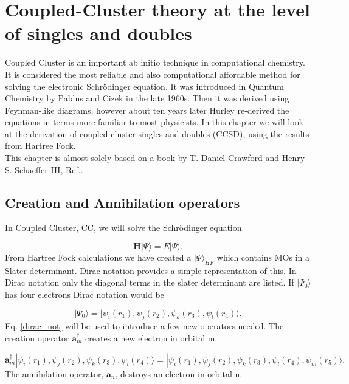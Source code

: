 
\chapter{Coupled-Cluster theory at the level of singles and doubles}



Coupled Cluster is an important ab initio technique in computational chemistry. It is considered the most reliable and also computational affordable method for solving the electronic Schr\"{o}dinger equation. It was introduced in Quantum Chemistry by Paldus and Cizek in the late 1960s. Then it was derived using Feynman-like diagrams, however about ten years later Hurley re-derived the equations in terms more familiar to most physicists. In this chapter we will look at the derivation of coupled cluster singles and doubles (CCSD), using the results from Hartree Fock. \\

This chapter is almost solely based on a book by T. Daniel Crawford and Henry S. Schaeffer III, Ref.\cite{ccsdbook11}. 

\section{Creation and Annihilation operators}
In Coupled Cluster, CC, we will solve the Schr\"{o}dinger equation.

\begin{equation}
\textbf{H} | \Psi \rangle = E | \Psi \rangle \label{SE} .
\end{equation}
From Hartree Fock calculations we have created a $|\Psi\rangle_{HF}$ which contains MOs in a Slater determinant. Dirac notation provides a simple representation of this. In Dirac notation only the diagonal terms in the slater determinant are listed. If $|\Psi_0 \rangle$ has four electrons Dirac notation would be

\begin{equation}
|\Psi_0 \rangle =  |\psi_i(r_1), \psi_j(r_2), \psi_k(r_3), \psi_l(r_4) \rangle . \label{dirac_not} 
\end{equation}
Eq. \eqref{dirac_not} will be used to introduce a few new operators needed. The creation operator $\textbf{a}^{\dag}_m$ creates a new electron in orbital m.

\begin{equation}
\textbf{a}^{\dag}_m |\psi_i(r_1), \psi_j(r_2), \psi_k(r_3), \psi_l(r_4) \rangle = |\psi_i(r_1), \psi_j(r_2), \psi_k(r_3), \psi_l(r_4), \psi_m(r_5) \rangle .
\end{equation}
The annihilation operator, $\textbf{a}_n$, destroys an electron in orbital n.

